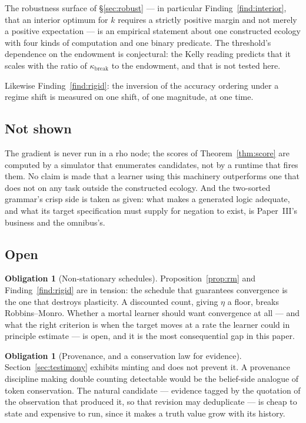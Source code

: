 \documentclass[11pt,a4paper]{article}
\theoremstyle{plain}
\theoremstyle{definition}
\newtheorem{obligation}[theorem]{Obligation}
\theoremstyle{remark}
\newcommand{\rhoc}{\textsf{rho}}
\begin{document}
The robustness surface of \S\ref{sec:robust} --- in particular
Finding~\ref{find:interior}, that an interior optimum for $k$ requires a
strictly positive margin and not merely a positive expectation --- is an
empirical statement about one constructed ecology with four kinds of computation
and one binary predicate. The threshold's dependence on the endowment is
conjectural: the Kelly reading predicts that it scales with the ratio of
$\kappa_{\mathrm{break}}$ to the endowment, and that is not tested here.

Likewise Finding~\ref{find:rigid}: the inversion of the accuracy ordering under a
regime shift is measured on one shift, of one magnitude, at one time.

\subsection{Not shown}

The gradient is never run in a \rhoc{} node; the scores of
Theorem~\ref{thm:score} are computed by a simulator that enumerates candidates,
not by a runtime that fires them. No claim is made that a learner using this
machinery outperforms one that does not on any task outside the constructed
ecology. And the two-sorted grammar's crisp side is taken as given: what makes a
generated logic adequate, and what its target specification must supply for
negation to exist, is Paper~III's business and the omnibus's.

\subsection{Open}

\begin{obligation}[Non-stationary schedules]\label{ob:nonstat}
Proposition~\ref{prop:rm} and Finding~\ref{find:rigid} are in tension: the
schedule that guarantees convergence is the one that destroys plasticity. A
discounted count, giving $\eta$ a floor, breaks Robbins--Monro. Whether a mortal
learner should want convergence at all --- and what the right criterion is when
the target moves at a rate the learner could in principle estimate --- is open,
and it is the most consequential gap in this paper.
\end{obligation}

\begin{obligation}[Provenance, and a conservation law for evidence]
\label{ob:provenance}
Section~\ref{sec:testimony} exhibits minting and does not prevent it. A
provenance discipline making double counting detectable would be the belief-side
analogue of token conservation. The natural candidate --- evidence tagged by the
quotation of the observation that produced it, so that revision may deduplicate
--- is cheap to state and expensive to run, since it makes a truth value grow with
its history.
\end{obligation}
\end{document}
